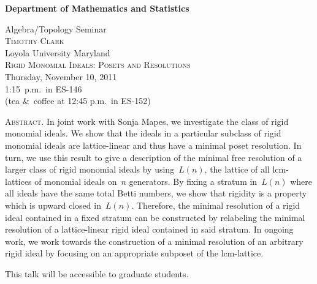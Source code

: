 \documentclass[12pt]{article}
\begin{document}
\noindent\hspace{-28px}%
\hfill\textsf{\textbf{\footnotesize%
Department of Mathematics and Statistics}}\bigskip\bigskip

\begin{center}\Large
  \textsf{{\huge Algebra/Topology Seminar}}\\[2.5\bigskipamount]
  \textsc{Timothy Clark}\\
  {\large Loyola University Maryland}\\[\bigskipamount]
  \textsc{Rigid Monomial Ideals: Posets and Resolutions}\\[2\bigskipamount]
  Thursday, November 10, 2011\\ 1:15~p.m.\ in ES-146\\
  (tea \&\ coffee at 12:45 p.m.\ in ES-152)
\end{center}\bigskip\bigskip

\large\noindent\textsc{Abstract.}
In joint work with Sonja Mapes, we investigate the class of rigid monomial ideals.  We show that the ideals in a particular subclass of rigid monomial ideals are lattice-linear and thus have a minimal poset resolution.  In turn, we use this result to give a description of the minimal free resolution of a larger class of rigid monomial ideals by using~$L(n)$, the lattice of all lcm-lattices of monomial ideals on~$n$ generators.  By fixing a stratum in~$L(n)$ where all ideals have the same total Betti numbers, we show that rigidity is a property which is upward closed in~$L(n)$.  Therefore, the minimal resolution of a rigid ideal contained in a fixed stratum can be constructed by relabeling the minimal resolution of a lattice-linear rigid ideal contained in said stratum.  In ongoing work, we work towards the construction of a minimal resolution of an arbitrary rigid ideal by focusing on an appropriate subposet of the lcm-lattice.

This talk will be accessible to graduate students.
\end{document}
